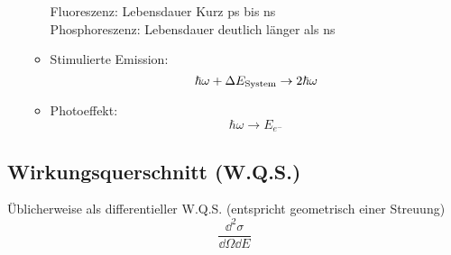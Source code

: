 \begin{enumerate}[A)]
\begin{itemize}
\begin{equation*}
		\end{equation*}
		Fluoreszenz: Lebensdauer Kurz ps bis ns \\
		Phosphoreszenz: Lebensdauer deutlich länger als ns \\
		\item Stimulierte Emission:
		\begin{equation*}
		\hbar \omega + \Delta E_{\textrm{System}} \rightarrow 2 \hbar \omega
		\end{equation*}
		\item Photoeffekt:
		\begin{equation*}
		\hbar \omega \rightarrow E_{e^-}
		\end{equation*}
	\end{itemize}
\end{enumerate}

\subsection{Wirkungsquerschnitt (W.Q.S.)}

Üblicherweise als differentieller W.Q.S. (entspricht geometrisch einer Streuung)
\begin{equation*}
\frac{\dd^2 \sigma}{\dd \Omega \dd E}
\end{equation*}
\\
\\
\\

